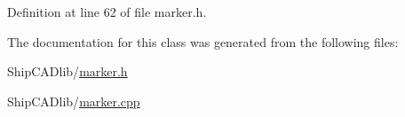 Definition at line 62 of file marker.\-h.



The documentation for this class was generated from the following files\-:\begin{DoxyCompactItemize}
\item 
Ship\-C\-A\-Dlib/\hyperlink{marker_8h}{marker.\-h}\item 
Ship\-C\-A\-Dlib/\hyperlink{marker_8cpp}{marker.\-cpp}\end{DoxyCompactItemize}
